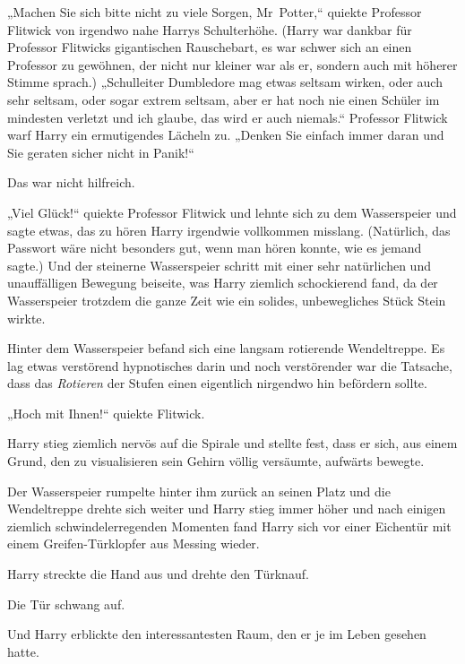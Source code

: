 {„Machen Sie sich bitte nicht zu viele Sorgen, Mr~Potter,“ quiekte Professor Flitwick von irgendwo nahe Harrys Schulterhöhe. (Harry war dankbar für Professor Flitwicks gigantischen Rauschebart, es war schwer sich an einen Professor zu gewöhnen, der nicht nur kleiner war als er, sondern auch mit höherer Stimme sprach.) „Schulleiter Dumbledore mag etwas seltsam wirken, oder auch sehr seltsam, oder sogar extrem seltsam, aber er hat noch nie einen Schüler im mindesten verletzt und ich glaube, das wird er auch niemals.“ Professor Flitwick warf Harry ein ermutigendes Lächeln zu. „Denken Sie einfach immer daran und Sie geraten sicher nicht in Panik!“

Das war nicht hilfreich.

„Viel Glück!“ quiekte Professor Flitwick und lehnte sich zu dem Wasserspeier und sagte etwas, das zu hören Harry irgendwie vollkommen misslang. (Natürlich, das Passwort wäre nicht besonders gut, wenn man hören konnte, wie es jemand sagte.) Und der steinerne Wasserspeier schritt mit einer sehr natürlichen und unauffälligen Bewegung beiseite, was Harry ziemlich schockierend fand, da der Wasserspeier trotzdem die ganze Zeit wie ein solides, unbewegliches Stück Stein wirkte.

Hinter dem Wasserspeier befand sich eine langsam rotierende Wendeltreppe. Es lag etwas verstörend hypnotisches darin und noch verstörender war die Tatsache, dass das \emph{Rotieren} der Stufen einen eigentlich nirgendwo hin befördern sollte.

„Hoch mit Ihnen!“ quiekte Flitwick.

Harry stieg ziemlich nervös auf die Spirale und stellte fest, dass er sich, aus einem Grund, den zu visualisieren sein Gehirn völlig versäumte, aufwärts bewegte.

Der Wasserspeier rumpelte hinter ihm zurück an seinen Platz und die Wendeltreppe drehte sich weiter und Harry stieg immer höher und nach einigen ziemlich schwindelerregenden Momenten fand Harry sich vor einer Eichentür mit einem Greifen-Türklopfer aus Messing wieder.

Harry streckte die Hand aus und drehte den Türknauf.

Die Tür schwang auf.

Und Harry erblickte den interessantesten Raum, den er je im Leben gesehen hatte.

}
